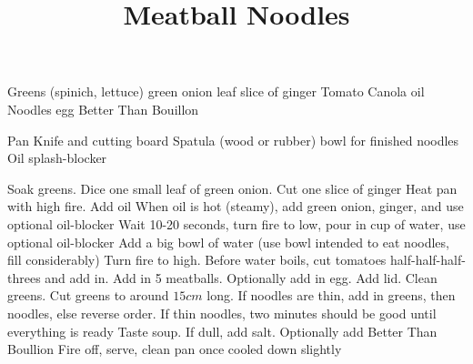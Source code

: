 \documentclass[10pt, twocolumn]{recipe}
\title{Meatball Noodles\vspace{0em}}
\begin{document}
\maketitle
\begin{ingredients}
  \Item Greens (spinich, lettuce)
   green onion leaf
   slice of ginger
   Tomato
  \Item Canola oil
  \Item Noodles
  \Item {} egg
  \Item \Optional \Sauce Better Than Bouillon
\end{ingredients}

\begin{equipment}
  \Item Pan
  \Item Knife and cutting board
  \Item Spatula (wood or rubber)
   bowl for finished noodles
  \Item \Optional Oil splash-blocker
  \newpage
\end{equipment}

\begin{procedure}
\Step Soak greens. Dice one small leaf of green onion. Cut one slice of ginger
\Step Heat pan with high fire. Add oil
\Step When oil is hot (steamy), add green onion, ginger, and use optional oil-blocker
\Step Wait 10-20 seconds, turn fire to low, pour in cup of water, use optional oil-blocker
\Step Add a big bowl of water (use bowl intended to eat noodles, fill considerably)
\Step Turn fire to high. Before water boils, cut tomatoes half-half-half-threes and add in. Add in 5 meatballs. Optionally add in egg. Add lid.
\Step Clean greens. Cut greens to around $15cm$ long.
\Step If noodles are thin, add in greens, then noodles, else reverse order.
\Note If thin noodles, two minutes should be good until everything is ready
\Step Taste soup. If dull, add salt. Optionally add \Sauce Better Than Boullion
\Step Fire off, serve, clean pan once cooled down slightly

\end{procedure}
\end{document}
